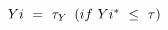 $Yi{\rm{\ }} = {\rm{\ }}{{\tau }_Y}{\rm{\ }}\left( {if{\rm{\ }}Y{{i}^{\rm{*}}}{\rm{\ }} \le {\rm{\ }}\tau } \right)$
